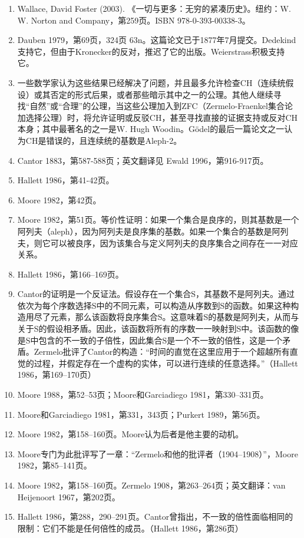 \begin{enumerate}
\item Wallace, David Foster (2003). 《一切与更多：无穷的紧凑历史》。纽约：W. W. Norton and Company，第259页。ISBN 978-0-393-00338-3。
\item Dauben 1979，第69页，324页 63n。这篇论文已于1877年7月提交。Dedekind支持它，但由于Kronecker的反对，推迟了它的出版。Weierstrass积极支持它。
\item 一些数学家认为这些结果已经解决了问题，并且最多允许检查CH（连续统假设）或其否定的形式后果，或者那些暗示其中之一的公理。其他人继续寻找“自然”或“合理”的公理，当这些公理加入到ZFC（Zermelo-Fraenkel集合论加选择公理）时，将允许证明或反驳CH，甚至寻找直接的证据支持或反对CH本身；其中最著名的之一是W. Hugh Woodin。Gödel的最后一篇论文之一认为CH是错误的，且连续统的基数是Aleph-2。
\item Cantor 1883，第587-588页；英文翻译见 Ewald 1996，第916-917页。
\item Hallett 1986，第41-42页。
\item Moore 1982，第42页。
\item Moore 1982，第51页。等价性证明：如果一个集合是良序的，则其基数是一个阿列夫（aleph），因为阿列夫是良序集的基数。如果一个集合的基数是阿列夫，则它可以被良序，因为该集合与定义阿列夫的良序集合之间存在一一对应关系。
\item Hallett 1986，第166–169页。
\item Cantor的证明是一个反证法。假设存在一个集合S，其基数不是阿列夫。通过依次为每个序数选择S中的不同元素，可以构造从序数到S的函数。如果这种构造用尽了元素，那么该函数将良序集合S。这意味着S的基数是阿列夫，从而与关于S的假设相矛盾。因此，该函数将所有的序数一一映射到S中。该函数的像是S中包含的不一致的子倍性，因此集合S是一个不一致的倍性，这是一个矛盾。Zermelo批评了Cantor的构造：“时间的直觉在这里应用于一个超越所有直觉的过程，并假定存在一个虚构的实体，可以进行连续的任意选择。”（Hallett 1986，第169–170页）
\item Moore 1988，第52–53页；Moore和Garciadiego 1981，第330–331页。
\item Moore和Garciadiego 1981，第331，343页；Purkert 1989，第56页。
\item Moore 1982，第158–160页。Moore认为后者是他主要的动机。
\item Moore专门为此批评写了一章：“Zermelo和他的批评者（1904–1908）”，Moore 1982，第85–141页。
\item Moore 1982，第158–160页。Zermelo 1908，第263–264页；英文翻译：van Heijenoort 1967，第202页。
\item Hallett 1986，第288，290–291页。Cantor曾指出，不一致的倍性面临相同的限制：它们不能是任何倍性的成员。（Hallett 1986，第286页）

\end{enumerate}
